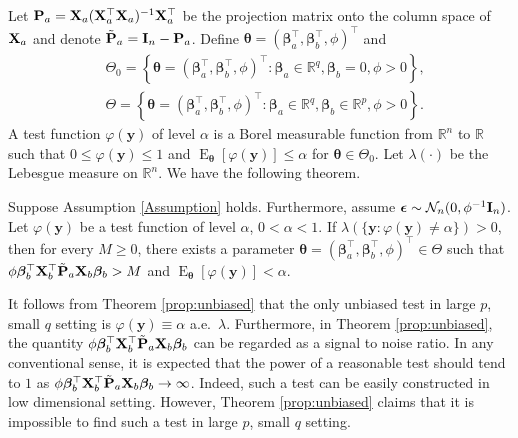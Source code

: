 \documentclass[smallextended]{svjour3}       %
\DeclareMathOperator{\myE}{E}
\newcommand{\By}{\mathbf{y}}    \newcommand{\Bz}{\mathbf{z}}
\newcommand{\bfsym}[1]{\ensuremath{\boldsymbol{#1}}}
\def\bbeta{\bfsym \beta}
\def\btheta{\bfsym {\theta}}           \def\bTheta {\bfsym {\Theta}}
\begin{document}
Let $\mathbf{P}_a=\mathbf{X}_a(\mathbf{X}_a^\top \mathbf{X}_a)^{-1} \mathbf{X}_a^\top$ be the projection matrix onto the column space of $\mathbf{X}_a$ and denote $\tilde {\mathbf{P}}_a = \mathbf{I}_n-\mathbf{P}_a$.
Define $\btheta =(\bbeta_a^\top , \bbeta_b^\top , \phi)^\top$ and 
\begin{equation*}
    \begin{split}
        &\Theta_0 = \left\{\btheta=(\bbeta_a^\top , \bbeta_b^\top , \phi)^\top: \bbeta_a \in \mathbb R^{q}, \bbeta_b=0, \phi>0\right\},
    \\
    &\Theta = \left\{\btheta=(\bbeta_a^\top , \bbeta_b^\top , \phi)^\top: \bbeta_a \in \mathbb R^{q}, \bbeta_b\in \mathbb R^p, \phi>0\right\}.
    \end{split}
\end{equation*}
A test function $\varphi(\By)$ of level $\alpha$ is a Borel measurable function from $\mathbb R^n$ to $\mathbb R$ such that $0\leq \varphi(\By) \leq 1$ and $\myE_{\btheta} [\varphi(\By)]\leq \alpha$ for $\btheta\in \Theta_0$.
Let $\lambda(\cdot)$ be the Lebesgue measure on $\mathbb R^n$.
We have the following theorem.
\begin{theorem}\label{prop:unbiased}
    Suppose Assumption \ref{Assumption} holds.
    Furthermore, assume $\bepsilon\sim \mathcal N_n (0, \phi^{-1}\BI_n)$.
    Let $\varphi(\By)$ be a test function of level $\alpha$, $0 <\alpha <1$.
    If $\lambda(\{\By:\varphi(\By)\neq \alpha\})>0$, then for every $M\geq 0$, there exists a parameter $\btheta=(\bbeta_a^\top,\bbeta_b^\top,\phi)^\top \in \Theta$ such that $\phi\bbeta_b^\top \BX_b^\top \tilde \BP_a \BX_b \bbeta_b > M$ and $\myE_{\btheta} [\varphi(\By)]< \alpha$.
\end{theorem}
It follows from Theorem \ref{prop:unbiased} that the only unbiased test in large $p$, small $q$ setting is $\varphi(\By) \equiv \alpha$ a.e.\ $\lambda$.
Furthermore, in Theorem \ref{prop:unbiased}, the quantity $\phi \bbeta_b^\top \BX_b^\top \tilde \BP_a \BX_b \bbeta_b$ can be regarded as a signal to noise ratio.
In any conventional sense, it is expected that the power of a reasonable test should tend to $1$ as $\phi \bbeta_b^\top \BX_b^\top \tilde \BP_a \BX_b \bbeta_b \to \infty$.
Indeed, such a test can be easily constructed in low dimensional setting.
However, Theorem \ref{prop:unbiased} claims that it is impossible to find such a test in large $p$, small $q$ setting.
\end{document}
